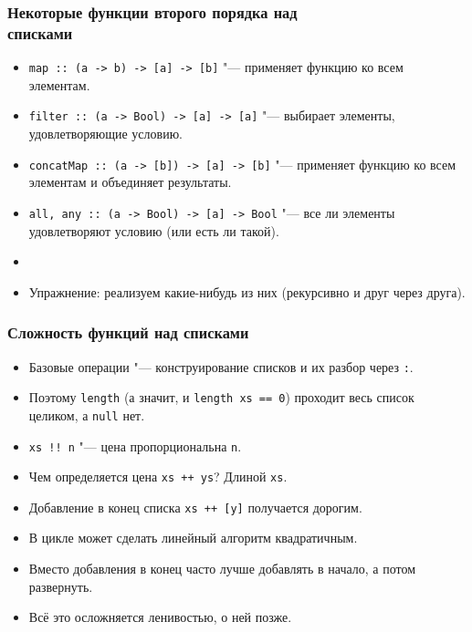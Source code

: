 \documentclass[11pt]{beamer}
\begin{document}
\begin{frame}[fragile]
\frametitle{Некоторые функции второго порядка над\\ списками}
\begin{itemize}
    \item \lstinline|map :: (a -> b) -> [a] -> [b]| \pause"--- применяет функцию ко всем элементам.
    \item \lstinline|filter :: (a -> Bool) -> [a] -> [a]| \pause"--- выбирает элементы, удовлетворяющие условию.
    \item \lstinline|concatMap :: (a -> [b]) -> [a] -> [b]| \pause"--- применяет функцию ко всем элементам и объединяет результаты.
    \item \lstinline|all, any :: (a -> Bool) -> [a] -> Bool| \pause"--- все ли элементы удовлетворяют условию (или есть ли такой).
    \pause
    \item[]
    \item Упражнение: реализуем какие-нибудь из них (рекурсивно и друг через друга).
\end{itemize}
\end{frame}

\begin{frame}[fragile]
\frametitle{Сложность функций над списками}
\begin{itemize}
    \item Базовые операции "--- конструирование списков и их разбор через \lstinline|:|.
    \pause
    \item Поэтому \lstinline|length| (а значит, и \lstinline|length xs == 0|) проходит весь список целиком, а \lstinline|null| нет.
    \pause
    \item \lstinline|xs !! n| "--- цена пропорциональна \pause\lstinline|n|.
    \pause
    \item Чем определяется цена \lstinline|xs ++ ys|? \pause Длиной \lstinline|xs|.
    \pause
    \item Добавление в конец списка \lstinline|xs ++ [y]| получается дорогим.
    \item В цикле может сделать линейный алгоритм квадратичным.
    \pause 
    \item Вместо добавления в конец часто лучше добавлять в начало, а потом развернуть.
    \pause
    \item Всё это осложняется ленивостью, о ней позже.
\end{itemize}
\end{frame}
\end{document}
